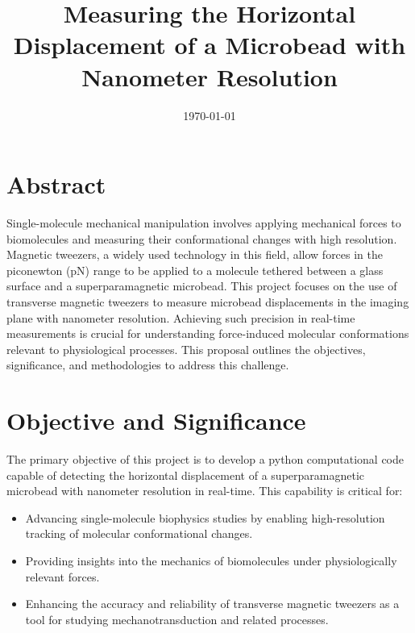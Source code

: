\documentclass[12pt]{article}
\title{Measuring the Horizontal Displacement of a Microbead with Nanometer Resolution}
\author{}
\date{\today}
\begin{document}
\maketitle

\section*{Abstract}
Single-molecule mechanical manipulation involves applying mechanical forces to biomolecules and measuring their conformational changes with high resolution. Magnetic tweezers, a widely used technology in this field, allow forces in the piconewton (pN) range to be applied to a molecule tethered between a glass surface and a superparamagnetic microbead. This project focuses on the use of transverse magnetic tweezers to measure microbead displacements in the imaging plane with nanometer resolution. Achieving such precision in real-time measurements is crucial for understanding force-induced molecular conformations relevant to physiological processes. This proposal outlines the objectives, significance, and methodologies to address this challenge.

\section*{Objective and Significance}
The primary objective of this project is to develop a python computational code capable of detecting the horizontal displacement of a superparamagnetic microbead with nanometer resolution in real-time. This capability is critical for:
\begin{itemize}
    \item Advancing single-molecule biophysics studies by enabling high-resolution tracking of molecular conformational changes.
    \item Providing insights into the mechanics of biomolecules under physiologically relevant forces.
    \item Enhancing the accuracy and reliability of transverse magnetic tweezers as a tool for studying mechanotransduction and related processes.
\end{itemize}
\end{document}
